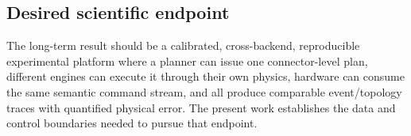 \subsection{Desired scientific endpoint}

The long-term result should be a calibrated, cross-backend, reproducible experimental
platform where a planner can issue one connector-level plan, different engines can
execute it through their own physics, hardware can consume the same semantic command
stream, and all produce comparable event/topology traces with quantified physical
error. The present work establishes the data and control boundaries needed to pursue
that endpoint.

